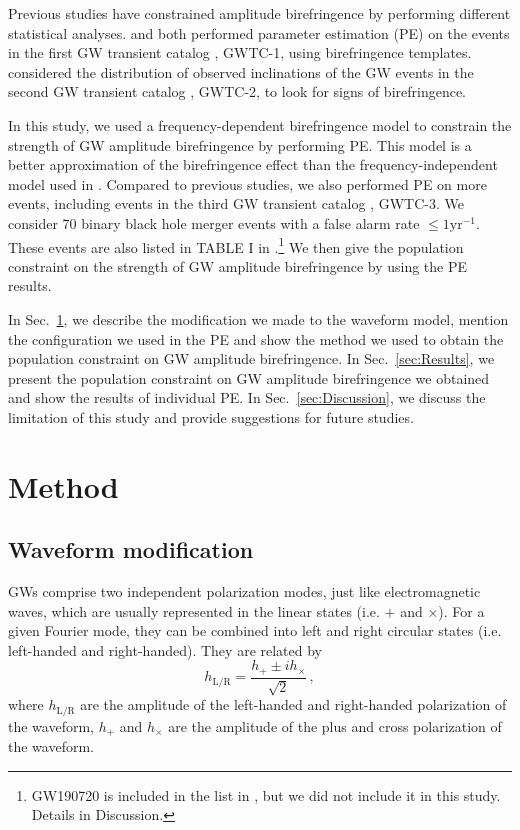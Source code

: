 \documentclass[aps,prd,twocolumn,superscriptaddress,preprintnumbers,floatfix,nofootinbib]{revtex4-2}
\begin{document}
Previous studies have constrained amplitude birefringence by performing different statistical analyses.
\citet{Yamada_2020} and \citet{Wang_2021} both performed parameter estimation (PE) on the events in the first GW transient catalog \citep{GWTC-1}, GWTC-1, using birefringence templates.
\citet{Okounkova_2022} considered the distribution of observed inclinations of the GW events in the second GW transient catalog \citep{GWTC-2}, GWTC-2, to look for signs of birefringence.

In this study, we used a frequency-dependent birefringence model to constrain the strength of GW amplitude birefringence by performing PE.
This model is a better approximation of the birefringence effect than the frequency-independent model used in \citet{Okounkova_2022}.
Compared to previous studies, we also performed PE on more events, including events in the third GW transient catalog \citep{GWTC-3}, GWTC-3.
We consider 70 binary black hole merger events with a false alarm rate $\leq1\mathrm{yr^{-1}}$.
These events are also listed in TABLE I in \citet{GWTC-3_population}.\footnote{
GW190720 is included in the list in \citet{GWTC-3_population}, but we did not include it in this study.
Details in Discussion.}
We then give the population constraint on the strength of GW amplitude birefringence by using the PE results.

In Sec.~\ref{sec:Method}, we describe the modification we made to the waveform model, mention the configuration we used in the PE and show the method we used to obtain the population constraint on GW amplitude birefringence.
In Sec.~\ref{sec:Results}, we present the population constraint on GW amplitude birefringence we obtained and show the results of individual PE.
In Sec.~\ref{sec:Discussion}, we discuss the limitation of this study and provide suggestions for future studies.

\section{Method}
\label{sec:Method}

\subsection{Waveform modification}
GWs comprise two independent polarization modes, just like electromagnetic waves, which are usually represented in the linear states (i.e. $+$ and $\times$).
For a given Fourier mode, they can be combined into left and right circular states (i.e. left-handed and right-handed).
They are related by
\begin{equation}
    h_{\mathrm{L/R}} = \frac{h_+ \pm i h_\times}{\sqrt{2}}\,,
\end{equation}
where $h_{\mathrm{L/R}}$ are the amplitude of the left-handed and right-handed polarization of the waveform, $h_+$ and $h_\times$ are the amplitude of the plus and cross polarization of the waveform.
\end{document}
